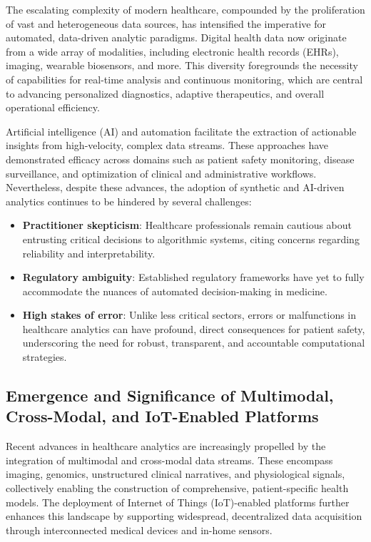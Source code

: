 The escalating complexity of modern healthcare, compounded by the proliferation of vast and heterogeneous data sources, has intensified the imperative for automated, data-driven analytic paradigms. Digital health data now originate from a wide array of modalities, including electronic health records (EHRs), imaging, wearable biosensors, and more. This diversity foregrounds the necessity of capabilities for real-time analysis and continuous monitoring, which are central to advancing personalized diagnostics, adaptive therapeutics, and overall operational efficiency.

Artificial intelligence (AI) and automation facilitate the extraction of actionable insights from high-velocity, complex data streams. These approaches have demonstrated efficacy across domains such as patient safety monitoring, disease surveillance, and optimization of clinical and administrative workflows. Nevertheless, despite these advances, the adoption of synthetic and AI-driven analytics continues to be hindered by several challenges:

\begin{itemize}
    \item \textbf{Practitioner skepticism}: Healthcare professionals remain cautious about entrusting critical decisions to algorithmic systems, citing concerns regarding reliability and interpretability.
    \item \textbf{Regulatory ambiguity}: Established regulatory frameworks have yet to fully accommodate the nuances of automated decision-making in medicine.
    \item \textbf{High stakes of error}: Unlike less critical sectors, errors or malfunctions in healthcare analytics can have profound, direct consequences for patient safety, underscoring the need for robust, transparent, and accountable computational strategies.
\end{itemize}

\subsection{Emergence and Significance of Multimodal, Cross-Modal, and IoT-Enabled Platforms}

Recent advances in healthcare analytics are increasingly propelled by the integration of multimodal and cross-modal data streams. These encompass imaging, genomics, unstructured clinical narratives, and physiological signals, collectively enabling the construction of comprehensive, patient-specific health models. The deployment of Internet of Things (IoT)-enabled platforms further enhances this landscape by supporting widespread, decentralized data acquisition through interconnected medical devices and in-home sensors.

